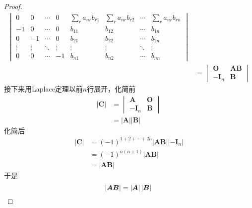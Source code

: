 {\begin{proof}
\begin{align*}
\begin{vmatrix}
                0      & 0      & \cdots & 0      & \displaystyle\sum_{r}a_{nr}b_{r1} & \displaystyle\sum_{r}a_{nr}b_{r2} & \cdots & \displaystyle\sum_{r}a_{nr}b_{rn} \\
                -1     & 0      & \cdots & 0      & b_{11}                            & b_{12}                            & \cdots & b_{1n}                            \\
                0      & -1     & \cdots & 0      & b_{21}                            & b_{22}                            & \cdots & b_{2n}                            \\
                \vdots & \vdots & \ddots & \vdots & \vdots                            & \vdots                            & \ddots & \vdots                            \\
                0      & 0      & \cdots & -1     & b_{n1}                            & b_{n2}                            & \cdots & b_{nn}
            \end{vmatrix} \\
                                & =
            \begin{vmatrix}
                \bm{O}    & \bm{AB} \\
                -\bm{I}_n & \bm{B}
            \end{vmatrix}
        \end{align*}
        接下来用Laplace定理以前$n$行展开，化简前
        \begin{align*}
            \left|\bm{C}\right| & =
            \begin{vmatrix}
                \bm{A}    & \bm{O} \\
                -\bm{I}_n & \bm{B}
            \end{vmatrix}                           \\
                                & =\left| \bm{A} \right|
            \left| \bm{B} \right|
        \end{align*}
        化简后
        \begin{align*}
            \left|
            \bm{C}
            \right|
             & =
            \left( -1 \right) ^{1+2+\cdots+2n}
            \left|\bm{AB}\right|
            \left|-\bm{I}_n\right|                                      \\
             & =\left(-1\right)^{n\left(n+1\right)}\left|\bm{AB}\right| \\
             & =\left|\bm{AB}\right|
        \end{align*}
        于是\[
            \left|\bm{AB}\right|=\left|\bm{A}\right|\left|\bm{B}\right|\qedhere
        \]
    \end{proof}
}
